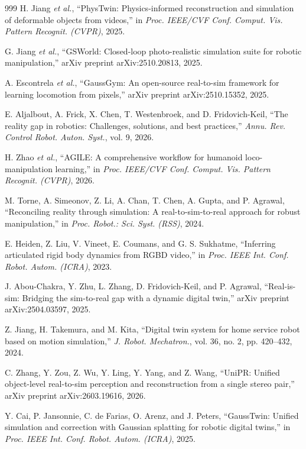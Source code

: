 \documentclass[12pt,a4paper,oneside]{report}
\begin{document}
\begin{thebibliography}{999}
H. Jiang \textit{et al.}, ``PhysTwin: Physics-informed reconstruction and simulation of deformable objects from videos,'' in \textit{Proc. IEEE/CVF Conf. Comput. Vis. Pattern Recognit. (CVPR)}, 2025.

G. Jiang \textit{et al.}, ``{GSWorld}: Closed-loop photo-realistic simulation suite for robotic manipulation,'' arXiv preprint arXiv:2510.20813, 2025.

A. Escontrela \textit{et al.}, ``{GaussGym}: An open-source real-to-sim framework for learning locomotion from pixels,'' arXiv preprint arXiv:2510.15352, 2025.

E. Aljalbout, A. Frick, X. Chen, T. Westenbroek, and D. Fridovich-Keil, ``The reality gap in robotics: Challenges, solutions, and best practices,'' \textit{Annu. Rev. Control Robot. Auton. Syst.}, vol. 9, 2026.

H. Zhao \textit{et al.}, ``{AGILE}: A comprehensive workflow for humanoid loco-manipulation learning,'' in \textit{Proc. IEEE/CVF Conf. Comput. Vis. Pattern Recognit. (CVPR)}, 2026.

M. Torne, A. Simeonov, Z. Li, A. Chan, T. Chen, A. Gupta, and P. Agrawal, ``Reconciling reality through simulation: A real-to-sim-to-real approach for robust manipulation,'' in \textit{Proc. Robot.: Sci. Syst. (RSS)}, 2024.

E. Heiden, Z. Liu, V. Vineet, E. Coumans, and G. S. Sukhatme, ``Inferring articulated rigid body dynamics from RGBD video,'' in \textit{Proc. IEEE Int. Conf. Robot. Autom. (ICRA)}, 2023.

J. Abou-Chakra, Y. Zhu, L. Zhang, D. Fridovich-Keil, and P. Agrawal, ``Real-is-sim: Bridging the sim-to-real gap with a dynamic digital twin,'' arXiv preprint arXiv:2504.03597, 2025.

Z. Jiang, H. Takemura, and M. Kita, ``Digital twin system for home service robot based on motion simulation,'' \textit{J. Robot. Mechatron.}, vol. 36, no. 2, pp. 420--432, 2024.

C. Zhang, Y. Zou, Z. Wu, Y. Ling, Y. Yang, and Z. Wang, ``{UniPR}: Unified object-level real-to-sim perception and reconstruction from a single stereo pair,'' arXiv preprint arXiv:2603.19616, 2026.

Y. Cai, P. Jansonnie, C. de Farias, O. Arenz, and J. Peters, ``{GaussTwin}: Unified simulation and correction with Gaussian splatting for robotic digital twins,'' in \textit{Proc. IEEE Int. Conf. Robot. Autom. (ICRA)}, 2025.


\end{thebibliography}
\end{document}

